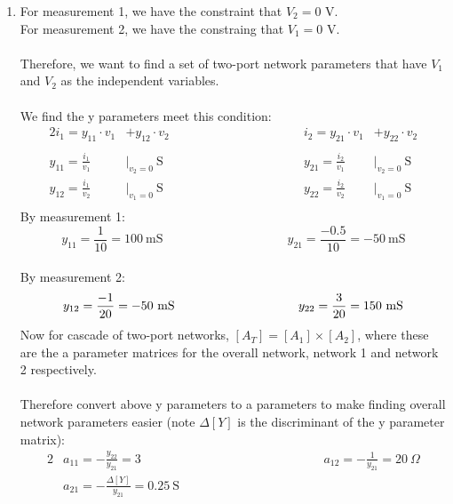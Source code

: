 \begin{enumerate}
	\item{
		For measurement 1, we have the constraint that $V_2 = 0$ V. \\
		For measurement 2, we have the constraing that $V_1 = 0$ V. \\
		\\
		Therefore, we want to find a set of two-port network parameters that have $V_1$ and $V_2$ as the independent variables. \\
		\\
		We find the y parameters meet this condition:
		\begin{alignat*}{2}
			i_1 = y_{11} \cdot v_1 &+ y_{12} \cdot v_2 &\qquad \qquad \qquad \qquad \qquad
			i_2 = y_{21} \cdot v_1 &+ y_{22} \cdot v_2 \\ \\
			y_{11} = \frac{i_1}{v_1} &\Bigg|_{v_2 = 0} \ \text{S} &\qquad \qquad \qquad \qquad \qquad
			y_{21} = \frac{i_2}{v_1} &\Bigg|_{v_2 = 0} \ \text{S} \\
			y_{12} = \frac{i_1}{v_2} &\Bigg|_{v_1 = 0} \ \text{S} &\qquad \qquad \qquad \qquad \qquad
			y_{22} = \frac{i_2}{v_2} &\Bigg|_{v_1 = 0} \ \text{S} \\
		\end{alignat*}
		By measurement 1:
		\begin{equation*}
			y_{11} = \frac{1}{10} = 100 \ \text{mS} \qquad \qquad \qquad \qquad \qquad
			y_{21} = \frac{-0.5}{10} = -50 \ \text{mS}
		\end{equation*}
		\\ By measurement 2:
		\begin{equation*}
			y_{12} = \frac{-1}{20} = -50 \ \text{mS} \qquad \qquad \qquad \qquad \qquad
			y_{22} = \frac{3}{20} = 150 \ \text{mS} \\
		\end{equation*}
		Now for cascade of two-port networks, $[A_T] = [A_1] \times [A_2]$, where these are the a parameter matrices for the overall network, network 1 and network 2 respectively. \\
		\\
		Therefore convert above y parameters to a parameters to make finding overall network parameters easier (note $\Delta [Y]$ is the discriminant of the y parameter matrix):
		\begin{alignat*}{2}
			&a_{11} = -\frac{y_{22}}{y_{21}} = 3 &\qquad \qquad \qquad \qquad \qquad
			&a_{12} = -\frac{1}{y_{21}} = 20 \ \Omega \\
			&a_{21} = -\frac{\Delta [Y]}{y_{21}} = 0.25 \ \text{S} &\qquad \qquad \qquad \qquad \qquad

\end{alignat*}}
\end{enumerate}
